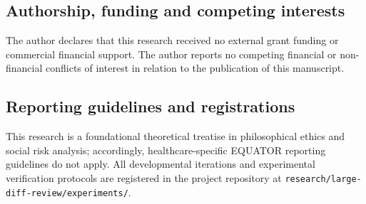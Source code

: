 \documentclass[11pt,twocolumn]{article}
\begin{document}
\subsection*{Authorship, funding and competing interests}
The author declares that this research received no external grant funding or commercial financial support. The author reports no competing financial or non-financial conflicts of interest in relation to the publication of this manuscript.

\subsection*{Reporting guidelines and registrations}
This research is a foundational theoretical treatise in philosophical ethics and social risk analysis; accordingly, healthcare-specific EQUATOR reporting guidelines do not apply. All developmental iterations and experimental verification protocols are registered in the project repository at \texttt{research/large-diff-review/experiments/}.
\end{document}
